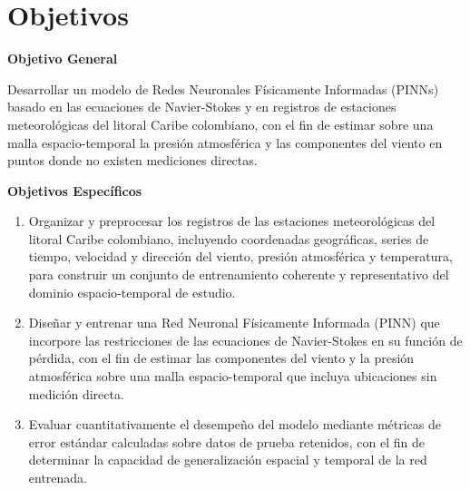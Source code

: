 \chapter{Objetivos}

\textbf{Objetivo General}

Desarrollar un modelo de Redes Neuronales Físicamente Informadas (PINNs) basado en las ecuaciones de Navier-Stokes y en registros de estaciones meteorológicas del litoral Caribe colombiano, con el fin de estimar sobre una malla espacio-temporal la presión atmosférica y las componentes del viento en puntos donde no existen mediciones directas.

\vspace{25pt}

\textbf{Objetivos Específicos}

\begin{enumerate}
    \item Organizar y preprocesar los registros de las estaciones meteorológicas del litoral Caribe colombiano, incluyendo coordenadas geográficas, series de tiempo, velocidad y dirección del viento, presión atmosférica y temperatura, para construir un conjunto de entrenamiento coherente y representativo del dominio espacio-temporal de estudio.

    \item Diseñar y entrenar una Red Neuronal Físicamente Informada (PINN) que incorpore las restricciones de las ecuaciones de Navier-Stokes en su función de pérdida, con el fin de estimar las componentes del viento y la presión atmosférica sobre una malla espacio-temporal que incluya ubicaciones sin medición directa.

    \item Evaluar cuantitativamente el desempeño del modelo mediante métricas de error estándar calculadas sobre datos de prueba retenidos, con el fin de determinar la capacidad de generalización espacial y temporal de la red entrenada.

\end{enumerate}


